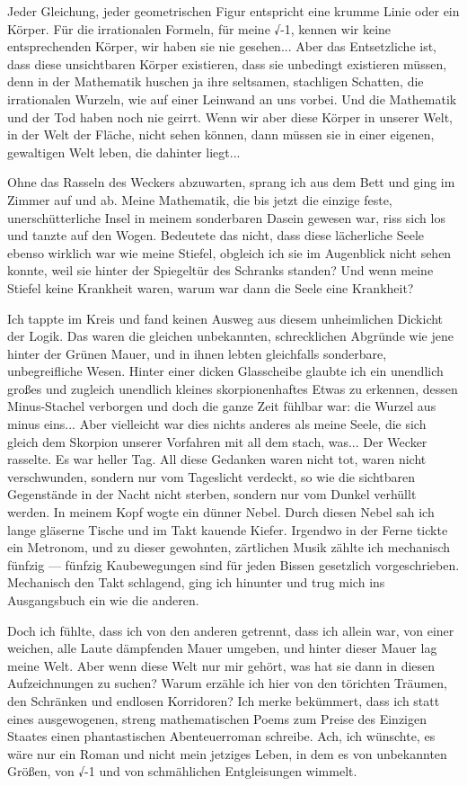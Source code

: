 Jeder Gleichung, jeder geometrischen Figur entspricht eine krumme
Linie oder ein Körper. Für die irrationalen Formeln, für meine √-1,
kennen wir keine entsprechenden Körper, wir haben sie nie
gesehen... Aber das Entsetzliche ist, dass diese unsichtbaren
Körper existieren, dass sie unbedingt existieren müssen, denn in
der Mathematik huschen ja ihre seltsamen, stachligen Schatten, die
irrationalen Wurzeln, wie auf einer Leinwand an uns vorbei. Und die
Mathematik und der Tod haben noch nie geirrt. Wenn wir aber diese
Körper in unserer Welt, in der Welt der Fläche, nicht sehen können,
dann müssen sie in einer eigenen, gewaltigen Welt leben, die
dahinter liegt...

Ohne das Rasseln des Weckers abzuwarten, sprang ich aus dem Bett
und ging im Zimmer auf und ab. Meine Mathematik, die bis jetzt die
einzige feste, unerschütterliche Insel in meinem sonderbaren Dasein
gewesen war, riss sich los und tanzte auf den Wogen. Bedeutete das
nicht, dass diese lächerliche Seele ebenso wirklich war wie meine
Stiefel, obgleich ich sie im Augenblick nicht sehen konnte, weil
sie hinter der Spiegeltür des Schranks standen? Und wenn meine
Stiefel keine Krankheit waren, warum war dann die Seele eine
Krankheit?

Ich tappte im Kreis und fand keinen Ausweg aus diesem unheimlichen
Dickicht der Logik. Das waren die gleichen unbekannten,
schrecklichen Abgründe wie jene hinter der Grünen Mauer, und in
ihnen lebten gleichfalls sonderbare, unbegreifliche Wesen. Hinter
einer dicken Glasscheibe glaubte ich ein unendlich großes und
zugleich unendlich kleines skorpionenhaftes Etwas zu erkennen,
dessen Minus-Stachel verborgen und doch die ganze Zeit fühlbar war:
die Wurzel aus minus eins... Aber vielleicht war dies nichts
anderes als meine Seele, die sich gleich dem Skorpion unserer
Vorfahren mit all dem stach, was... Der Wecker rasselte. Es war
heller Tag. All diese Gedanken waren nicht tot, waren nicht
verschwunden, sondern nur vom Tageslicht verdeckt, so wie die
sichtbaren Gegenstände in der Nacht nicht sterben, sondern nur vom
Dunkel verhüllt werden. In meinem Kopf wogte ein dünner Nebel.
Durch diesen Nebel sah ich lange gläserne Tische und im Takt
kauende Kiefer. Irgendwo in der Ferne tickte ein Metronom, und zu
dieser gewohnten, zärtlichen Musik zählte ich mechanisch fünfzig —
fünfzig Kaubewegungen sind für jeden Bissen gesetzlich
vorgeschrieben. Mechanisch den Takt schlagend, ging ich hinunter
und trug mich ins Ausgangsbuch ein wie die anderen.

Doch ich fühlte, dass ich von den anderen getrennt, dass ich allein
war, von einer weichen, alle Laute dämpfenden Mauer umgeben, und
hinter dieser Mauer lag meine Welt. Aber wenn diese Welt nur mir
gehört, was hat sie dann in diesen Aufzeichnungen zu suchen? Warum
erzähle ich hier von den törichten Träumen, den Schränken und
endlosen Korridoren? Ich merke bekümmert, dass ich statt eines
ausgewogenen, streng mathematischen Poems zum Preise des Einzigen
Staates einen phantastischen Abenteuerroman schreibe. Ach, ich
wünschte, es wäre nur ein Roman und nicht mein jetziges Leben, in
dem es von unbekannten Größen, von √-1 und von schmählichen
Entgleisungen wimmelt.

